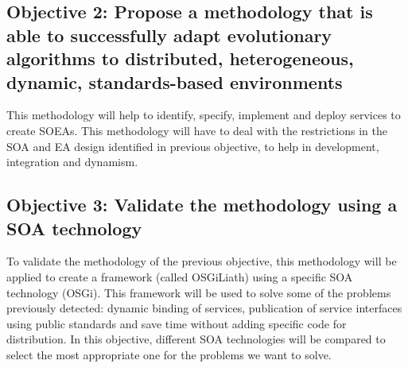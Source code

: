 \newcommand{\objectivemethodology}{Propose a methodology that is able to successfully adapt evolutionary algorithms to distributed, heterogeneous, dynamic, standards-based environments}
\subsection*{Objective 2: \objectivemethodology} 
\label{subsec:intro:obj:methodology}
This methodology will help to identify, specify, implement and deploy services to create SOEAs. This methodology will have to deal with the restrictions in the SOA and EA design identified in previous objective, to help in development, integration and dynamism.

\newcommand{\objectiveframework}{Validate the methodology using a SOA technology}
\subsection*{Objective 3: \objectiveframework}
\label{subsec:intro:obj:fwork}
To validate the methodology of the previous objective, this me\-tho\-do\-lo\-gy will be applied to create a framework (called OSGiLiath) using a specific SOA technology (OSGi). This framework will be used to solve some of the problems previously detected: dynamic binding of services, publication of service interfaces using public standards and save time without adding specific code for distribution. In this objective, different SOA technologies will be compared to select the most appropriate one for the problems we want to solve.



